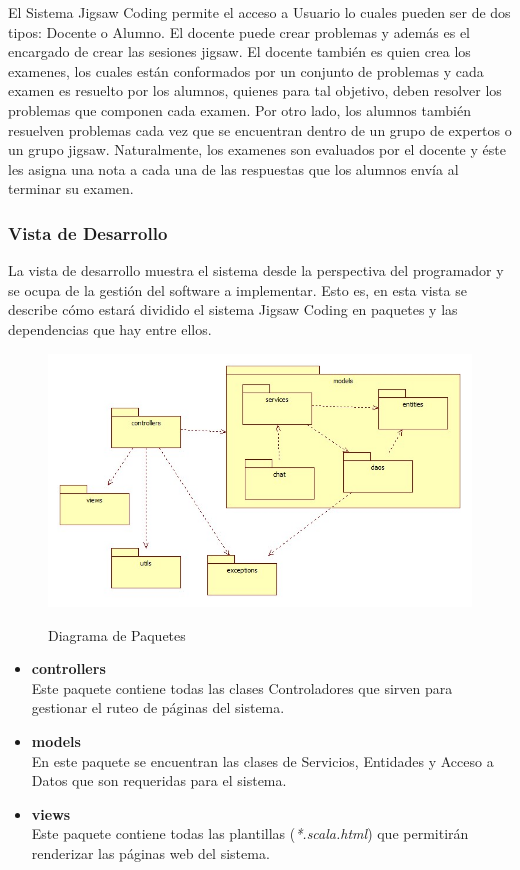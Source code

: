 El Sistema Jigsaw Coding permite el acceso a Usuario lo cuales pueden ser de dos tipos: Docente o Alumno. El docente puede crear problemas y además es el encargado de crear las sesiones jigsaw. El docente también es quien crea los examenes, los cuales están conformados por un conjunto de problemas y cada examen es resuelto por los alumnos, quienes para tal objetivo, deben resolver los problemas que componen cada examen. Por otro lado, los alumnos también resuelven problemas cada vez que se encuentran dentro de un grupo de expertos o un grupo jigsaw. Naturalmente, los examenes son evaluados por el docente y éste les asigna una nota a cada una de las respuestas que los alumnos envía al terminar su examen.

\subsubsection{Vista de Desarrollo}
La vista de desarrollo muestra el sistema desde la perspectiva del programador y se ocupa de la gestión del software a implementar. Esto es, en esta vista se describe cómo estará dividido el sistema Jigsaw Coding en paquetes y las dependencias que hay entre ellos.
\begin{figure}[!h]
	\centering
	\includegraphics[scale=0.5]{figuras/sad/diagrama_de_paquetes.jpg}\\
	\caption{Diagrama de Paquetes}\label{fig:c4_diagrama_de_paquetes}
\end{figure}
\begin{itemize}
	\item \textbf{controllers}\\Este paquete contiene todas las clases Controladores que sirven para gestionar el ruteo de páginas del sistema.
	\item \textbf{models}\\En este paquete se encuentran las clases de Servicios, Entidades y Acceso a Datos que son requeridas para el sistema.
	\item \textbf{views}\\Este paquete contiene todas las plantillas (\emph{*.scala.html}) que permitirán renderizar las páginas web del sistema.
\end{itemize}

